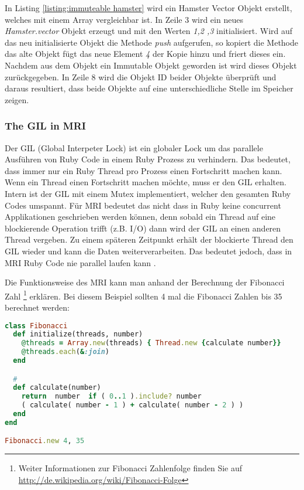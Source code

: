 In Listing \ref{listing:immuteable hamster} wird ein Hamster Vector Objekt erstellt, welches mit einem Array vergleichbar ist. In Zeile 3 wird ein neues \emph{Hamster.vector} Objekt erzeugt und mit den Werten \emph{1,2 ,3} initialisiert. Wird auf das neu initialisierte Objekt die Methode \emph{push} aufgerufen, so kopiert die Methode das alte Objekt fügt das neue Element \emph{4} der Kopie hinzu und friert dieses ein. Nachdem aus dem Objekt ein Immutable Objekt geworden ist wird dieses Objekt zurückgegeben. In Zeile 8 wird die Objekt ID beider Objekte überprüft und daraus resultiert, dass beide Objekte auf eine unterschiedliche Stelle im Speicher zeigen. 

\subsubsection{The GIL in MRI}

Der GIL (Global Interpeter Lock) ist ein globaler Lock um das parallele Ausführen von Ruby Code in einem Ruby Prozess zu verhindern. Das bedeutet, dass immer nur ein Ruby Thread pro Prozess einen Fortschritt machen kann. Wenn ein Thread einen Fortschritt machen möchte, muss er den GIL erhalten. Intern ist der GIL mit einem Mutex implementiert, welcher den gesamten Ruby Codes umspannt. Für MRI bedeutet das nicht dass in Ruby keine concurrent Applikationen geschrieben werden können, denn sobald ein Thread auf eine blockierende Operation trifft (z.B. I/O) dann wird der GIL an einen anderen Thread vergeben. Zu einem späteren Zeitpunkt erhält der blockierte Thread den GIL wieder und kann die Daten weiterverarbeiten. Das bedeutet jedoch, dass in MRI Ruby Code nie parallel laufen kann \cite[p. 42]{Sto2013}. 


Die Funktionsweise des MRI kann man anhand der Berechnung der Fibonacci Zahl \footnote{Weiter Informationen zur Fibonacci Zahlenfolge finden Sie auf \url{http://de.wikipedia.org/wiki/Fibonacci-Folge}} erklären. Bei diesem Beispiel sollten 4 mal die Fibonacci Zahlen bis 35 berechnet werden:

\begin{lstlisting}[language=Ruby,label={listing:fibonacci},caption={Adaptiert von \cite{Sto2013}, Seite 21}]
class Fibonacci
  def initialize(threads, number)
    @threads = Array.new(threads) { Thread.new {calculate number}}
    @threads.each(&:join)
  end

  #
  def calculate(number)
    return  number  if ( 0..1 ).include? number
    ( calculate( number - 1 ) + calculate( number - 2 ) )
  end
end

Fibonacci.new 4, 35
\end{lstlisting}

